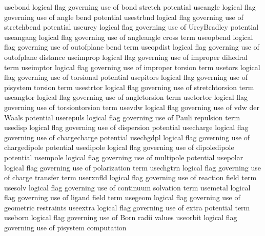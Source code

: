 \documentclass[letterpaper,11pt,english]{sphinxmanual}
\begin{document}

\begin{sphinxVerbatim}[commandchars=\\\{\}]
use\PYGZus{}bond        logical flag governing use of bond stretch potential
use\PYGZus{}angle       logical flag governing use of angle bend potential
use\PYGZus{}strbnd      logical flag governing use of stretch\PYGZhy{}bend potential
use\PYGZus{}urey        logical flag governing use of Urey\PYGZhy{}Bradley potential
use\PYGZus{}angang      logical flag governing use of angle\PYGZhy{}angle cross term
use\PYGZus{}opbend      logical flag governing use of out\PYGZhy{}of\PYGZhy{}plane bend term
use\PYGZus{}opdist      logical flag governing use of out\PYGZhy{}of\PYGZhy{}plane distance
use\PYGZus{}improp      logical flag governing use of improper dihedral term
use\PYGZus{}imptor      logical flag governing use of improper torsion term
use\PYGZus{}tors        logical flag governing use of torsional potential
use\PYGZus{}pitors      logical flag governing use of pi\PYGZhy{}system torsion term
use\PYGZus{}strtor      logical flag governing use of stretch\PYGZhy{}torsion term
use\PYGZus{}angtor      logical flag governing use of angle\PYGZhy{}torsion term
use\PYGZus{}tortor      logical flag governing use of torsion\PYGZhy{}torsion term
use\PYGZus{}vdw         logical flag governing use of vdw der Waals potential
use\PYGZus{}repuls      logical flag governing use of Pauli repulsion term
use\PYGZus{}disp        logical flag governing use of dispersion potential
use\PYGZus{}charge      logical flag governing use of charge\PYGZhy{}charge potential
use\PYGZus{}chgdpl      logical flag governing use of charge\PYGZhy{}dipole potential
use\PYGZus{}dipole      logical flag governing use of dipole\PYGZhy{}dipole potential
use\PYGZus{}mpole       logical flag governing use of multipole potential
use\PYGZus{}polar       logical flag governing use of polarization term
use\PYGZus{}chgtrn      logical flag governing use of charge transfer term
use\PYGZus{}rxnfld      logical flag governing use of reaction field term
use\PYGZus{}solv        logical flag governing use of continuum solvation term
use\PYGZus{}metal       logical flag governing use of ligand field term
use\PYGZus{}geom        logical flag governing use of geometric restraints
use\PYGZus{}extra       logical flag governing use of extra potential term
use\PYGZus{}born        logical flag governing use of Born radii values
use\PYGZus{}orbit       logical flag governing use of pisystem computation
\end{sphinxVerbatim}
\end{document}

